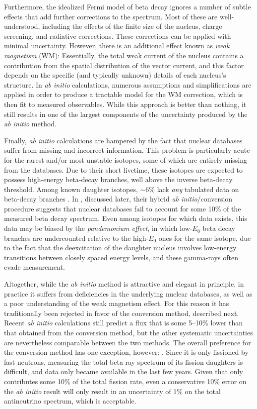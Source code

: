 \documentclass[../thesis.tex]{subfiles}
\begin{document}
Furthermore, the idealized Fermi model of beta decay ignores a number of subtle effects that add further corrections to the spectrum. Most of these are well-understood, including the effects of the finite size of the nucleus, charge screening, and radiative corrections. These corrections can be applied with minimal uncertainty. However, there is an additional effect known as \emph{weak magnetism} (WM): Essentially, the total weak current of the nucleus contains a contribution from the spatial distribution of the vector current, and this factor depends on the specific (and typically unknown) details of each nucleus's structure. In \emph{ab initio} calculations, numerous assumptions and simplifications are applied in order to produce a tractable model for the WM correction, which is then fit to measured observables. While this approach is better than nothing, it still results in one of the largest components of the uncertainty produced by the \emph{ab initio} method.

Finally, \emph{ab initio} calculations are hampered by the fact that nuclear databases suffer from missing and incorrect information. This problem is particularly acute for the rarest and/or most unstable isotopes, some of which are entirely missing from the databases. Due to their short livetime, these isotopes are expected to possess high-energy beta-decay branches, well above the inverse beta-decay threshold. Among known daughter isotopes, $\sim$6\% lack \emph{any} tabulated data on beta-decay branches \cite{DwyerLangford}. In \cite{PhysRevC.83.054615}, discussed later, their hybrid \emph{ab initio}/conversion procedure suggests that nuclear databases fail to account for some 10\% of the measured beta decay spectrum. Even among isotopes for which data exists, this data may be biased by the \emph{pandemonium effect}, in which low-$E_0$ beta decay branches are undercounted relative to the high-$E_0$ ones for the same isotope, due to the fact that the deexcitation of the daughter nucleus involves low-energy transitions between closely spaced energy levels, and these gamma-rays often evade measurement.

Altogether, while the \emph{ab initio} method is attractive and elegant in principle, in practice it suffers from deficiencies in the underlying nuclear databases, as well as a poor understanding of the weak magnetism effect. For this reason it has traditionally been rejected in favor of the conversion method, described next. Recent \emph{ab initio} calculations still predict a flux that is some 5--10\% lower than that obtained from the conversion method, but the other systematic uncertainties are nevertheless comparable between the two methods. The overall preference for the conversion method has one exception, however: \ureight. Since it is only fissioned by fast neutrons, measuring the total beta-ray spectrum of its fission daughters is difficult, and data only became available in the last few years. Given that \ureight only contributes some 10\% of the total fission rate, even a conservative 10\% error on the \emph{ab initio} result will only result in an uncertainty of 1\% on the total antineutrino spectrum, which is acceptable.
\end{document}

